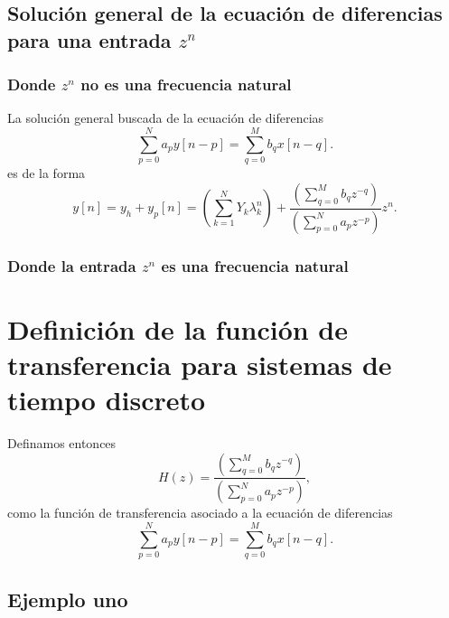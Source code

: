 \subsection{Soluci\'{o}n general de la ecuaci\'{o}n de diferencias para una entrada $z^{n}$}

\subsubsection{Donde $z^{n}$ no es una frecuencia natural}

La soluci\'{o}n general buscada de la ecuaci\'{o}n de diferencias
\begin{equation}
        \sum_{p=0}^{N}a_{p}y\left[ n-p\right] =\sum_{q=0}^{M}b_{q}x\left[ n-q\right].
\end{equation}
es de la forma
\begin{equation}
   y[n] = y_{h} + y_{p}[n] = 
     \left(\sum_{k=1}^{N}Y_{k}\lambda _{k}^n \right) +
    \frac{\left( \sum_{q=0}^{M}b_{q}z^{-q}\right) }{\left(\sum_{p=0}^{N}a_{p}z^{-p}\right) } z^{n}.
\end{equation}

\subsubsection{Donde la entrada $z^{n}$ es una frecuencia natural}

\section{Definici\'{o}n de la funci\'{o}n de transferencia para sistemas de tiempo discreto}

Definamos entonces 
\begin{equation}
  H\left( z\right) =
  \frac{\left( \sum_{q=0}^{M}b_{q}z^{-q}\right) }{\left(\sum_{p=0}^{N}a_{p}z^{-p}\right) },
  \label{eqhzdef}
\end{equation}
como la funci\'{o}n de transferencia asociado a la ecuaci\'{o}n de diferencias
\begin{equation}
  \sum_{p=0}^{N}a_{p}y\left[ n-p\right] =
  \sum_{q=0}^{M}b_{q}x\left[ n-q\right].  
\end{equation}

\subsection{Ejemplo uno}


